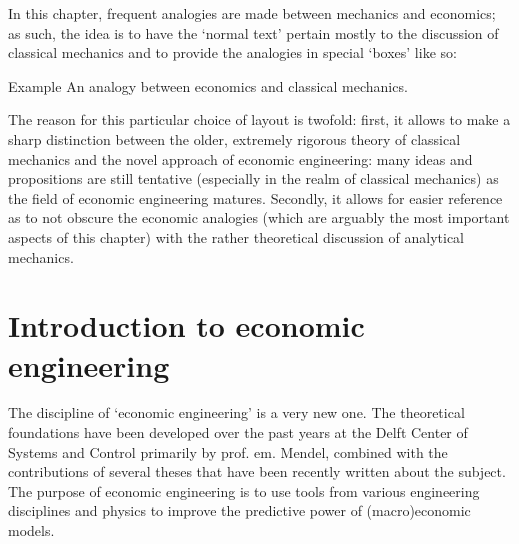 In this chapter, frequent analogies are made between mechanics and economics; as such, the idea is to have the `normal text' pertain mostly to the discussion of classical mechanics and to provide the analogies in special `boxes' like so:
\begin{econ}{Example}
    An analogy between economics and classical mechanics.
\end{econ}
The reason for this particular choice of layout is twofold: first, it allows to make a sharp distinction between the older, extremely rigorous theory of classical mechanics and the novel approach of economic engineering: many ideas and propositions are still tentative (especially in the realm of classical mechanics) as the field of economic engineering matures. Secondly, it allows for easier reference as to not obscure the economic analogies (which are arguably the most important aspects of this chapter) with the rather theoretical discussion of analytical mechanics.

\section{Introduction to economic engineering}
\label{sec:ee_intro}
The discipline of `economic engineering' is a very new one. The theoretical foundations have been developed over the past years at the Delft Center of Systems and Control primarily by prof. em. Mendel, combined with the contributions of several theses that have been recently written about the subject. The purpose of economic engineering is to use tools from various engineering disciplines and physics to improve the predictive power of (macro)economic models.

